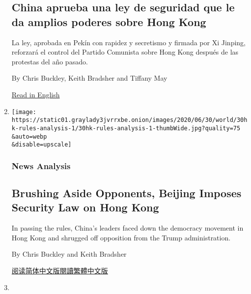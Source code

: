 \begin{enumerate}
  \hypertarget{china-aprueba-una-ley-de-seguridad-que-le-da-amplios-poderes-sobre-hong-kong}{%
  \subsection{China aprueba una ley de seguridad que le da amplios
  poderes sobre Hong
  Kong}\label{china-aprueba-una-ley-de-seguridad-que-le-da-amplios-poderes-sobre-hong-kong}}

  La ley, aprobada en Pekín con rapidez y secretismo y firmada por Xi
  Jinping, reforzará el control del Partido Comunista sobre Hong Kong
  después de las protestas del año pasado.

  By Chris Buckley, Keith Bradsher and Tiffany May

  \href{https://www.nytimes3xbfgragh.onion/2020/06/29/world/asia/china-hong-kong-security-law-rules.html}{Read
  in English}
\item
  \href{/2020/06/30/world/asia/china-critics-security-law-hong-kong.html}{}

  \texttt{[image: https://static01.graylady3jvrrxbe.onion/images/2020/06/30/world/30hk-rules-analysis-1/30hk-rules-analysis-1-thumbWide.jpg?quality=75\\\&auto=webp\\\&disable=upscale]}

  \hypertarget{news-analysis}{%
  \subsubsection{News Analysis}\label{news-analysis}}

  \hypertarget{brushing-aside-opponents-beijing-imposes-security-law-on-hong-kong}{%
  \subsection{Brushing Aside Opponents, Beijing Imposes Security Law on
  Hong
  Kong}\label{brushing-aside-opponents-beijing-imposes-security-law-on-hong-kong}}

  In passing the rules, China's leaders faced down the democracy
  movement in Hong Kong and shrugged off opposition from the Trump
  administration.

  By Chris Buckley and Keith Bradsher

  \href{https://cn.nytimes3xbfgragh.onion/china/20200701/china-critics-security-law-hong-kong/}{阅读简体中文版}\href{https://cn.nytimes3xbfgragh.onion/china/20200701/china-critics-security-law-hong-kong/zh-ha}{閱讀繁體中文版}
\item
  \href{/2020/06/29/world/asia/china-hong-kong-security-law-rules.html}{}


\end{enumerate}
